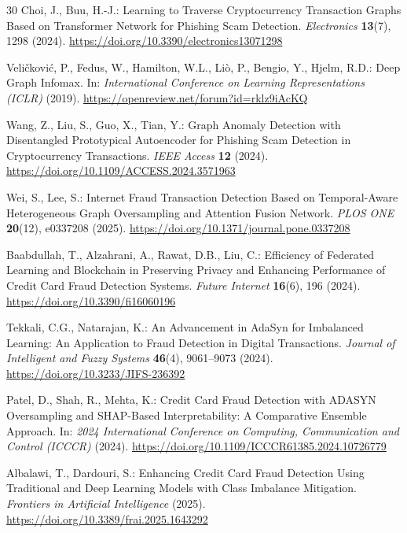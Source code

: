 \documentclass[12pt,a4paper]{article}
\begin{document}
\begin{thebibliography}{30}
  Choi, J., Buu, H.-J.:
  Learning to Traverse Cryptocurrency Transaction Graphs
  Based on Transformer Network for Phishing Scam
  Detection.
  \textit{Electronics} \textbf{13}(7), 1298 (2024).
  \url{https://doi.org/10.3390/electronics13071298}

  Veli\v{c}kovi\'{c}, P., Fedus, W., Hamilton, W.L.,
  Li\`{o}, P., Bengio, Y., Hjelm, R.D.:
  Deep Graph Infomax.
  In: \textit{International Conference on Learning
  Representations (ICLR)} (2019).
  \url{https://openreview.net/forum?id=rklz9iAcKQ}

  Wang, Z., Liu, S., Guo, X., Tian, Y.:
  Graph Anomaly Detection with Disentangled Prototypical
  Autoencoder for Phishing Scam Detection in
  Cryptocurrency Transactions.
  \textit{IEEE Access} \textbf{12} (2024).
  \url{https://doi.org/10.1109/ACCESS.2024.3571963}

  Wei, S., Lee, S.:
  Internet Fraud Transaction Detection Based on
  Temporal-Aware Heterogeneous Graph Oversampling and
  Attention Fusion Network.
  \textit{PLOS ONE} \textbf{20}(12), e0337208 (2025).
  \url{https://doi.org/10.1371/journal.pone.0337208}

  Baabdullah, T., Alzahrani, A., Rawat, D.B., Liu, C.:
  Efficiency of Federated Learning and Blockchain in
  Preserving Privacy and Enhancing Performance of
  Credit Card Fraud Detection Systems.
  \textit{Future Internet} \textbf{16}(6), 196 (2024).
  \url{https://doi.org/10.3390/fi16060196}

  Tekkali, C.G., Natarajan, K.:
  An Advancement in AdaSyn for Imbalanced Learning:
  An Application to Fraud Detection in Digital
  Transactions.
  \textit{Journal of Intelligent and Fuzzy Systems}
  \textbf{46}(4), 9061--9073 (2024).
  \url{https://doi.org/10.3233/JIFS-236392}

  Patel, D., Shah, R., Mehta, K.:
  Credit Card Fraud Detection with ADASYN Oversampling
  and SHAP-Based Interpretability: A Comparative
  Ensemble Approach.
  In: \textit{2024 International Conference on Computing,
  Communication and Control (ICCCR)} (2024).
  \url{https://doi.org/10.1109/ICCCR61385.2024.10726779}

  Albalawi, T., Dardouri, S.:
  Enhancing Credit Card Fraud Detection Using Traditional
  and Deep Learning Models with Class Imbalance
  Mitigation.
  \textit{Frontiers in Artificial Intelligence} (2025).
  \url{https://doi.org/10.3389/frai.2025.1643292}


\end{thebibliography}
\end{document}

